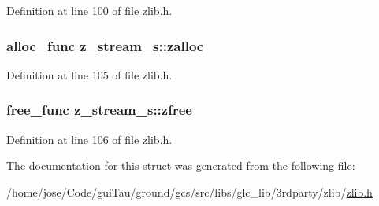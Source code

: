 Definition at line 100 of file zlib.\-h.

\hypertarget{structz__stream__s_a23a2299c384f808e76e9908f21216b0f}{
\subsubsection[{zalloc}]{\setlength{\rightskip}{0pt plus 5cm}alloc\-\_\-func z\-\_\-stream\-\_\-s\-::zalloc}}\label{structz__stream__s_a23a2299c384f808e76e9908f21216b0f}


Definition at line 105 of file zlib.\-h.

\hypertarget{structz__stream__s_a89eb750ade7f4f0b56bfdadf13344982}{
\subsubsection[{zfree}]{\setlength{\rightskip}{0pt plus 5cm}free\-\_\-func z\-\_\-stream\-\_\-s\-::zfree}}\label{structz__stream__s_a89eb750ade7f4f0b56bfdadf13344982}


Definition at line 106 of file zlib.\-h.



The documentation for this struct was generated from the following file\-:\begin{DoxyCompactItemize}
\item 
/home/jose/\-Code/gui\-Tau/ground/gcs/src/libs/glc\-\_\-lib/3rdparty/zlib/\hyperlink{zlib_8h}{zlib.\-h}\end{DoxyCompactItemize}
